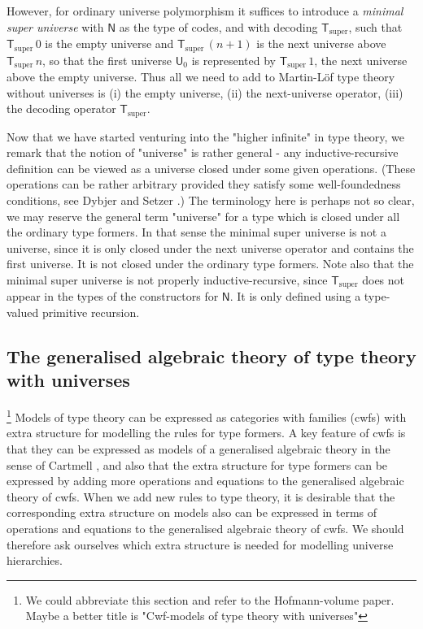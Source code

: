 \documentclass[11pt,a4paper]{article}
\def\UU{\mathsf{U}}
\newcommand{\N}{\mathsf{N}}
\newcommand{\T}{\mathsf{T}}
\newcommand{\Tsuper}{\T_{\mathrm{super}}}
\begin{document}
However, for ordinary universe polymorphism it suffices to introduce a {\em minimal super universe} with $\N$ as the type of codes, and with decoding $\Tsuper$,
such that $\Tsuper\,0$ is the empty universe and $\Tsuper\,(n + 1)$ is the next universe above $\Tsuper\,n$, so that the first universe $\UU_0$ is represented by $\Tsuper\,1$, the next universe above the empty universe. Thus all we need to add to Martin-Löf type theory without universes is (i) the empty universe, (ii) the next-universe operator, (iii) the decoding operator $\Tsuper$.

Now that we have started venturing into the "higher infinite" in type theory, we remark
that the notion of "universe" is rather general - any inductive-recursive definition can be viewed as a universe closed under some given operations. (These operations can be rather arbitrary provided they satisfy some well-foundedness conditions, see Dybjer and Setzer \cite{dybjer:laquila}.) The terminology here is perhaps not so clear, we may reserve the general term "universe" for a type which is closed under all the ordinary type formers. In that sense the minimal super universe is not a universe, since it is only closed under the next universe operator and contains the first universe. It is not closed under the ordinary type formers. Note also that the minimal super universe is not properly inductive-recursive, since $\Tsuper$ does not appear in the types of the constructors for $\N$. It is only defined using a type-valued primitive recursion.

\subsection{The generalised algebraic theory of type theory with universes}

\footnote{We could abbreviate this section and refer to the Hofmann-volume paper. Maybe a better title is "Cwf-models of type theory with universes"}
Models of type theory can be expressed as categories with families (cwfs) with extra structure for modelling the rules for type formers.  A key feature of cwfs is that they can be expressed as models of a generalised algebraic theory in the sense of Cartmell \cite{cartmell:apal}, and also that the extra structure for type formers can be expressed by adding more operations and equations to the generalised algebraic theory of cwfs. When we add new rules to type theory, it is desirable that the corresponding extra structure on  models also can be expressed in terms of operations and equations to the generalised algebraic theory of cwfs. We should therefore ask ourselves which extra structure is needed for modelling universe hierarchies.
\end{document}
